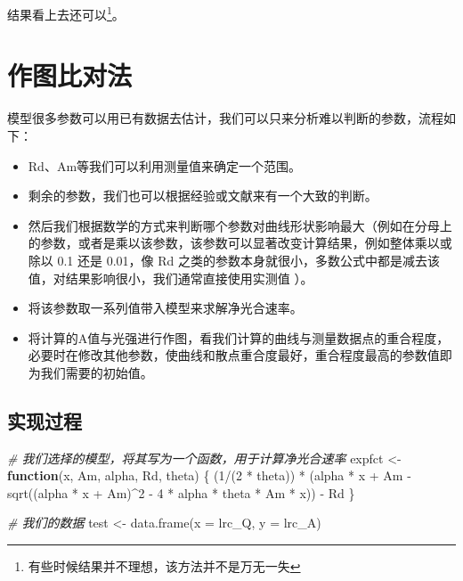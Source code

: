 \documentclass[
]{krantz}
\makeatletter
\newenvironment{Shaded}{\begin{snugshade}}{\end{snugshade}}
\newcommand{\AttributeTok}[1]{\textcolor[rgb]{0.77,0.63,0.00}{#1}}
\newcommand{\CommentTok}[1]{\textcolor[rgb]{0.56,0.35,0.01}{\textit{#1}}}
\newcommand{\ControlFlowTok}[1]{\textcolor[rgb]{0.13,0.29,0.53}{\textbf{#1}}}
\newcommand{\DecValTok}[1]{\textcolor[rgb]{0.00,0.00,0.81}{#1}}
\newcommand{\FunctionTok}[1]{\textcolor[rgb]{0.00,0.00,0.00}{#1}}
\newcommand{\NormalTok}[1]{#1}
\newcommand{\OtherTok}[1]{\textcolor[rgb]{0.56,0.35,0.01}{#1}}
\newcommand{\SpecialCharTok}[1]{\textcolor[rgb]{0.00,0.00,0.00}{#1}}
\providecommand{\tightlist}{%
  \setlength{\itemsep}{0pt}\setlength{\parskip}{0pt}}
\newenvironment{kframe}{%
\medskip{}
\setlength{\fboxsep}{.8em}
 \def\at@end@of@kframe{}%
 \ifinner\ifhmode%
  \def\at@end@of@kframe{\end{minipage}}%
  \begin{minipage}{\columnwidth}%
 \fi\fi%
 \def\FrameCommand##1{\hskip\@totalleftmargin \hskip-\fboxsep
 \colorbox{shadecolor}{##1}\hskip-\fboxsep
     \hskip-\linewidth \hskip-\@totalleftmargin \hskip\columnwidth}%
 \MakeFramed {\advance\hsize-\width
   \@totalleftmargin\z@ \linewidth\hsize
   \@setminipage}}%
 {\par\unskip\endMakeFramed%
 \at@end@of@kframe}
\renewenvironment{Shaded}{\begin{kframe}}{\end{kframe}}
\makeatother
\begin{document}
结果看上去还可以\footnote{有些时候结果并不理想，该方法并不是万无一失}。

\hypertarget{plot_comp}{%
\section{作图比对法}\label{plot_comp}}

模型很多参数可以用已有数据去估计，我们可以只来分析难以判断的参数，流程如下：

\begin{itemize}
\tightlist
\item
  Rd、Am等我们可以利用测量值来确定一个范围。
\item
  剩余的参数，我们也可以根据经验或文献来有一个大致的判断。
\item
  然后我们根据数学的方式来判断哪个参数对曲线形状影响最大（例如在分母上的参数，或者是乘以该参数，该参数可以显著改变计算结果，例如整体乘以或除以 0.1 还是 0.01，像 Rd 之类的参数本身就很小，多数公式中都是减去该值，对结果影响很小，我们通常直接使用实测值 ）。
\item
  将该参数取一系列值带入模型来求解净光合速率。
\item
  将计算的A值与光强进行作图，看我们计算的曲线与测量数据点的重合程度，必要时在修改其他参数，使曲线和散点重合度最好，重合程度最高的参数值即为我们需要的初始值。
\end{itemize}

\hypertarget{plot_exam}{%
\subsection{实现过程}\label{plot_exam}}

\begin{Shaded}
\begin{Highlighting}[]
\CommentTok{\# 我们选择的模型，将其写为一个函数，用于计算净光合速率}
\NormalTok{expfct }\OtherTok{\textless{}{-}} \ControlFlowTok{function}\NormalTok{(x, Am, alpha, Rd, theta) \{}
\NormalTok{  (}\DecValTok{1}\SpecialCharTok{/}\NormalTok{(}\DecValTok{2} \SpecialCharTok{*}\NormalTok{ theta)) }\SpecialCharTok{*}\NormalTok{ (alpha }\SpecialCharTok{*}\NormalTok{ x }\SpecialCharTok{+}\NormalTok{ Am }\SpecialCharTok{{-}} 
  \FunctionTok{sqrt}\NormalTok{((alpha }\SpecialCharTok{*}\NormalTok{ x }\SpecialCharTok{+}\NormalTok{ Am)}\SpecialCharTok{\^{}}\DecValTok{2} \SpecialCharTok{{-}} \DecValTok{4} \SpecialCharTok{*}\NormalTok{ alpha }\SpecialCharTok{*}\NormalTok{ theta }\SpecialCharTok{*}\NormalTok{ Am }\SpecialCharTok{*}\NormalTok{ x)) }\SpecialCharTok{{-}}\NormalTok{ Rd}
\NormalTok{\}}

\CommentTok{\# 我们的数据}
\NormalTok{test }\OtherTok{\textless{}{-}} \FunctionTok{data.frame}\NormalTok{(}\AttributeTok{x =}\NormalTok{ lrc\_Q, }\AttributeTok{y =}\NormalTok{ lrc\_A)}
\end{Highlighting}
\end{Shaded}
\end{document}
